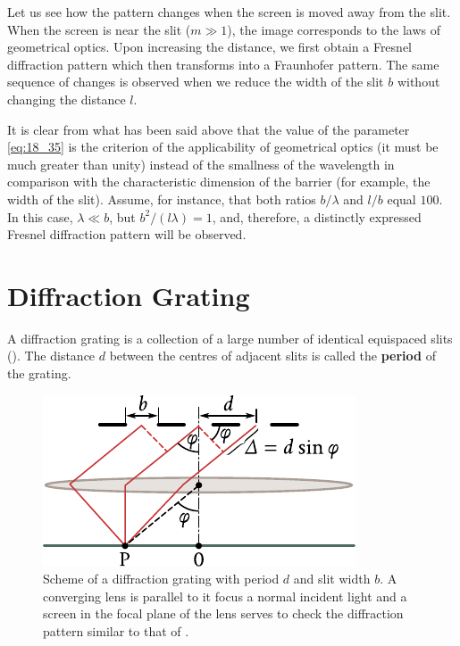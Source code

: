 Let us see how the pattern changes when the screen is moved away from the slit.
When the screen is near the slit ($m\gg 1$), the image corresponds to the laws of geometrical optics.
Upon increasing the distance, we first obtain a Fresnel diffraction pattern which then transforms into a Fraunhofer pattern.
The same sequence of changes is observed when we reduce the width of the slit $b$ without changing
the distance $l$.

It is clear from what has been said above that the value of the parameter \eqref{eq:18_35} is the criterion of the applicability of geometrical optics (it must be much greater than unity) instead of the smallness of the wavelength in comparison with the characteristic dimension of the barrier (for example, the width of the slit).
Assume, for instance, that both ratios $b/\lambda$ and $l/b$ equal $100$.
In this case, $\lambda\ll b$, but $b^2/(l\lambda)=1$, and, therefore, a distinctly expressed Fresnel diffraction pattern will be observed.

\section{Diffraction Grating}\label{sec:18_6}

A diffraction grating is a collection of a large number of identical equispaced slits ().
The distance $d$ between the centres of adjacent slits is called the \textbf{period} of the grating.

\begin{figure}[t]
	\begin{center}
		\includegraphics[scale=0.95]{figures/ch_18/fig_18_32.pdf}
        \caption[]{Scheme of a diffraction grating with period $d$ and slit width $b$. A converging lens is parallel to it focus a normal incident light and a screen in the focal plane of the lens serves to check the diffraction pattern similar to that of .}
		\label{fig:18_32}
	\end{center}
	\vspace{-0.9cm}
\end{figure}

